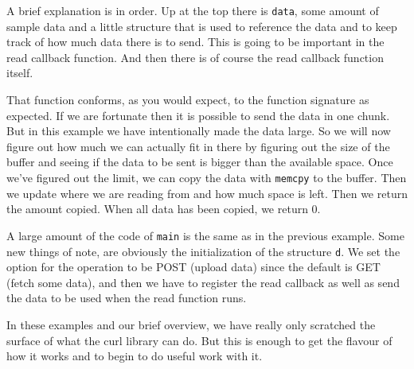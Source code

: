 A brief explanation is in order. Up at the top there is \texttt{data}, some amount of sample data and a little structure that is used to reference the data and to keep track of how much data there is to send. This is going to be important in the read callback function. And then there is of course the read callback function itself. 

That function conforms, as you would expect, to the function signature as expected. If we are fortunate then it is possible to send the data in one chunk. But in this example we have intentionally made the data large. So we will now figure out how much we can actually fit in there by figuring out the size of the buffer and seeing if the data to be sent is bigger than the available space. Once we've figured out the limit, we can copy the data with \texttt{memcpy} to the buffer. Then we update where we are reading from and how much space is left. Then we return the amount copied. When all data has been copied, we return 0.

A large amount of the code of \texttt{main} is the same as in the previous example. Some new things of note, are obviously the initialization of the structure \texttt{d}. We set the option for the operation to be POST (upload data) since the default is GET (fetch some data), and then we have to register the read callback as well as send the data to be used when the read function runs. 

In these examples and our brief overview, we have really only scratched the surface of what the curl library can do. But this is enough to get the flavour of how it works and to begin to do useful work with it.



